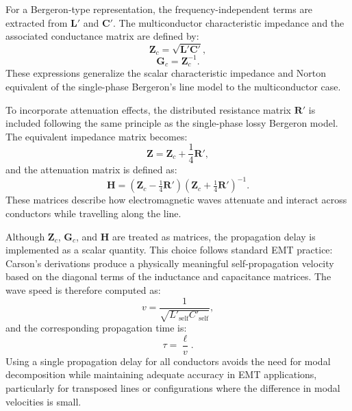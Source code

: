 For a Bergeron-type representation, the frequency-independent terms are extracted from $\bm{L}'$ and $\bm{C}'$. The multiconductor 
characteristic impedance and the associated conductance matrix are defined by:
\begin{equation}
    \bm{Z}_c = \sqrt{ \bm{L}' \bm{C}' },
\end{equation}
\begin{equation}
    \bm{G}_c = \bm{Z}_c^{-1}.
\end{equation}
These expressions generalize the scalar characteristic impedance and Norton equivalent of the single-phase Bergeron's line model to the 
multiconductor case.

To incorporate attenuation effects, the distributed resistance matrix $\bm{R}'$ is included following the same principle as the 
single-phase lossy Bergeron model. The equivalent impedance matrix becomes:
\begin{equation}
    \bm{Z} = \bm{Z}_c + \frac{1}{4}\bm{R}',
\end{equation}
and the attenuation matrix is defined as:
\begin{equation}
    \bm{H} = \left( \bm{Z}_c - \tfrac{1}{4}\bm{R}' \right)
                 \left( \bm{Z}_c + \tfrac{1}{4}\bm{R}' \right)^{-1}.
\end{equation}
These matrices describe how electromagnetic waves attenuate and interact across conductors while travelling along the line.

Although $\bm{Z}_c$, $\bm{G}_c$, and $\bm{H}$ are treated as matrices, the propagation delay is implemented as a 
scalar quantity. This choice follows standard EMT practice: Carson's derivations produce a physically meaningful self-propagation 
velocity based on the diagonal terms of the inductance and capacitance matrices. The wave speed is therefore computed as:
\begin{equation}
    v = \frac{1}{\sqrt{L'_{\mathrm{self}} C'_{\mathrm{self}}}},
\end{equation}
and the corresponding propagation time is:
\begin{equation}
    \tau = \frac{\ell}{v}.
\end{equation}
Using a single propagation delay for all conductors avoids the need for modal decomposition while maintaining adequate accuracy in 
EMT applications, particularly for transposed lines or configurations where the difference in modal velocities is small.

